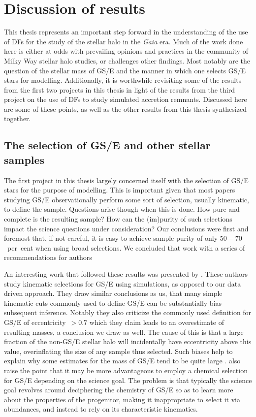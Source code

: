 \section{Discussion of results}

This thesis represents an important step forward in the understanding of the use of DFs for the study of the stellar halo in the \textit{Gaia} era. Much of the work done here is either at odds with prevailing opinions and practices in the community of Milky Way stellar halo studies, or challenges other findings. Most notably are the question of the stellar mass of GS/E and the manner in which one selects GS/E stars for modelling. Additionally, it is worthwhile revisiting some of the results from the first two projects in this thesis in light of the results from the third project on the use of DFs to study simulated accretion remnants. Discussed here are some of these points, as well as the other results from this thesis synthesized together.


\subsection{The selection of GS/E and other stellar samples}

The first project in this thesis largely concerned itself with the selection of GS/E stars for the purpose of modelling. This is important given that most papers studying GS/E observationally perform some sort of selection, usually kinematic, to define the sample. Questions arise though when this is done. How pure and complete is the resulting sample? How can the (im)purity of such selections impact the science questions under consideration? Our conclusions were first and foremost that, if not careful, it is easy to achieve sample purity of only $50-70$~per~cent when using broad selections. We concluded that work with a series of recommendations for authors 

An interesting work that followed these results was presented by \textcite{carrillo23}. These authors study kinematic selections for GS/E using simulations, as opposed to our data driven approach. They draw similar conclusions as us, that many simple kinematic cuts commonly used to define GS/E can be substantially bias subsequent inference. Notably they also criticize the commonly used definition for GS/E of eccentricity~$> 0.7$ which they claim leads to an overestimate of resulting masses, a conclusion we draw as well. The cause of this is that a large fraction of the non-GS/E stellar halo will incidentally have eccentricity above this value, overinflating the size of any sample thus selected. Such biases help to explain why some estimates for the mass of GS/E tend to be quite large \parencite[e.g.][ who use this eccentricity cut to define GS/E]{han23}. \textcite{carillo23} also raise the point that it may be more advantageous to employ a chemical selection for GS/E depending on the science goal. The problem is that typically the science goal revolves around deciphering the chemistry of GS/E so as to learn more about the properties of the progenitor, making it inappropriate to select it via abundances, and instead to rely on its characteristic kinematics.

